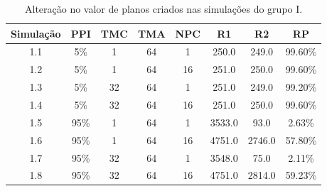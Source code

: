 \begin{table}
    \begin{center}
        \caption{ Alteração no valor de planos criados nas simulações do grupo I. }
        \label{table:plansaltv1}
        \begin{tabular}{ |c|c|c|c|c|c|c|c| }
            \hline
            \textbf{Simulação} & \textbf{PPI} & \textbf{TMC} & \textbf{TMA} & \textbf{NPC} & \textbf{R1} & \textbf{R2} & \textbf{RP}\\
            \hline
            1.1 & 5\% & 1 & 64 & 1 & 250.0 & 249.0 & 99.60\%\\
            \hline
            1.2 & 5\% & 1 & 64 & 16 & 251.0 & 250.0 & 99.60\%\\
            \hline
            1.3 & 5\% & 32 & 64 & 1 & 251.0 & 249.0 & 99.20\%\\
            \hline
            1.4 & 5\% & 32 & 64 & 16 & 251.0 & 250.0 & 99.60\%\\
            \hline
            1.5 & 95\% & 1 & 64 & 1 & 3533.0 & 93.0 & 2.63\%\\
            \hline
            1.6 & 95\% & 1 & 64 & 16 & 4751.0 & 2746.0 & 57.80\%\\
            \hline
            1.7 & 95\% & 32 & 64 & 1 & 3548.0 & 75.0 & 2.11\%\\
            \hline
            1.8 & 95\% & 32 & 64 & 16 & 4751.0 & 2814.0 & 59.23\%\\
            \hline
            
        \end{tabular}{}
    \end{center}{}
\end{table}


